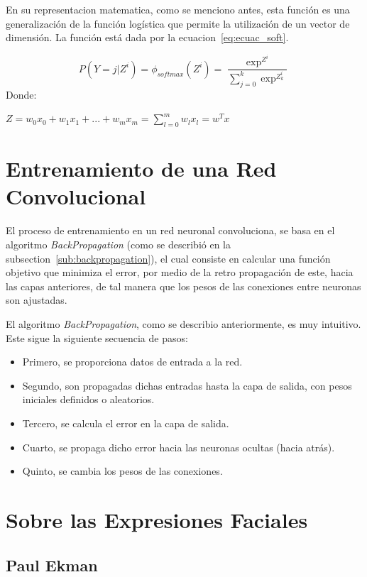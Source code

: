 En su representacion matematica, como se menciono antes, esta función es una generalización de la función logística que permite la utilización de un vector de dimensión. La función está dada por la ecuacion~\ref{eq:ecuac_soft}.

\begin{equation}\label{eq:ecuac_soft}
P(Y = j|Z^i) = \phi_{softmax}(Z^i)= \frac{\exp^{Z^i}}{\sum^k_{j=0}\exp^{Z^{i}_k}}
\end{equation}
Donde:

\begin{center} $Z = w_{0}x_{0} + w_{1}x_{1} +...+w_{m}x_{m} = \sum_{l=0}^m w_{l}x_{l} = w^Tx$\end{center}


\section{Entrenamiento de una Red Convolucional}

El proceso de entrenamiento en un red neuronal convoluciona, se basa en el algoritmo \textit{BackPropagation} (como se describió en la subsection~\ref{sub:backpropagation}), el cual consiste en calcular una función objetivo que minimiza el error, por medio de la retro propagación de este, hacia las capas anteriores, de tal manera que los pesos de las conexiones entre neuronas son ajustadas.

El algoritmo \textit{BackPropagation}, como se describio anteriormente, es muy intuitivo. Este sigue la siguiente secuencia de pasos:

\begin{itemize}
\item Primero, se proporciona datos de entrada a la red.
\item Segundo, son propagadas dichas entradas hasta la capa de salida, con pesos iniciales definidos o
aleatorios.
\item Tercero, se calcula el error en la capa de salida.
\item Cuarto, se propaga dicho error hacia las neuronas ocultas (hacia atrás).
\item Quinto, se cambia los pesos de las conexiones.
\end{itemize}

\section{Sobre las Expresiones Faciales}
\subsection{Paul Ekman}

